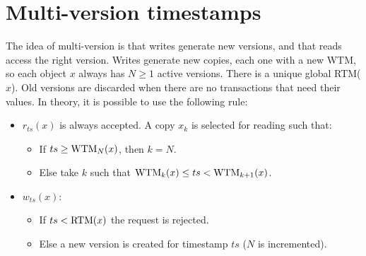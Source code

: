 \documentclass[12pt, a4paper]{report}
\newtheorem[style=M,bodystyle=\normalfont]{theorem}{Theorem}
\newtheorem[style=M,bodystyle=\normalfont]{corollary}{Corollary}
\newtheorem[style=M,bodystyle=\normalfont]{lemma}{Lemma}
\newtheorem[style=M,bodystyle=\normalfont]{definition}{Definition}
\begin{document}
    \section{Multi-version timestamps}
    The idea of multi-version is that writes generate new versions, and that reads access the right version. Writes generate new copies, each one with a new WTM, so each object $x$ 
    always has $N \geq 1$ active versions. There is a unique global RTM($x$). Old versions are discarded when there are no transactions that need their values. 
    In theory, it is possible to use the following rule: 
    \begin{itemize}
        \item $r_{ts}(x)$ is always accepted. A copy $x_k$ is selected for reading such that:
            \begin{itemize}
                \item If $ts \geq \textnormal{WTM}_N(x)$, then $k=N$.
                \item Else take $k$ such that $\textnormal{WTM}_k(x) \leq ts < \textnormal{WTM}_{k+1}(x)$. 
            \end{itemize}
        \item $w_{ts}(x)$: 
            \begin{itemize}
                \item If $ts < \textnormal{RTM}(x)$ the request is rejected. 
                \item Else a new version is created for timestamp $ts$ ($N$ is incremented). 
            \end{itemize}
    \end{itemize}
\end{document}
